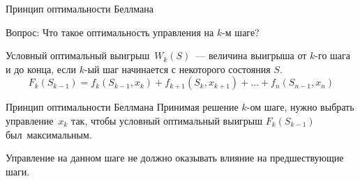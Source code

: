 \documentclass[unicode,11pt,notheorems,xcolor=table]{beamer}
\begin{document}
\begin{frame}{Принцип оптимальности Беллмана}
%

\begin{alertblock}{Вопрос:}
 Что такое оптимальность управления на $k$-м  шаге?
\end{alertblock}
	
\bigskip
    \alert{Условный оптимальный выигрыш~$W_k(S)$}~--- величина выигрыша от $k$-го шага и до конца, если $k$-ый шаг начинается с некоторого состояния $S$.
	$$
		F_k(S_{k-1})
		= f_{k}(S_{k-1},x_{k})+f_{k+1}(S_{k},x_{k+1})+\ldots+ f_n(S_{n-1},x_n)
	$$
	
       
	\begin{block}{Принцип оптимальности Беллмана} 
		Принимая решение $k$-ом шаге, нужно выбрать управление~$x_k$ так, чтобы условный оптимальный выигрыш $F_k(S_{k-1})$ был~максимальным. 
	\end{block}

\alert{Управление на данном шаге не должно оказывать влияние на предшествующие шаги.}

\end{frame}

%
%
%
%
\end{document}
